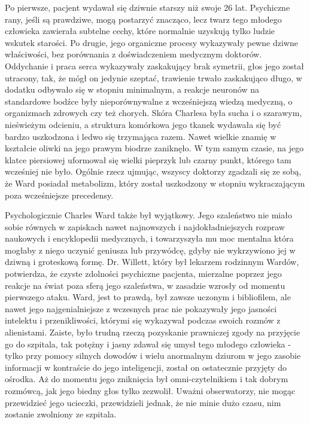 Po pierwsze, pacjent wydawał się dziwnie starszy niż swoje 26 lat. Psychiczne rany, jeśli są prawdziwe, mogą postarzyć znacząco, lecz twarz tego młodego człowieka zawierała subtelne cechy, które normalnie uzyskują tylko ludzie wskutek starości. Po drugie, jego organiczne procesy wykazywały pewne dziwne właściwości, bez porównania z doświadczeniem medycznym doktorów. Oddychanie i praca serca wykazywały zaskakujący brak symetrii, głos jego został utracony, tak, że mógł on jedynie szeptać, trawienie trwało zaskakująco długo, w dodatku odbywało się w stopniu minimalnym, a reakcje neuronów na standardowe bodźce były nieporównywalne z wcześniejszą wiedzą medyczną, o organizmach zdrowych czy też chorych. Skóra Charlesa była sucha i o szarawym, nieświeżym odcieniu, a struktura komórkowa jego tkanek wydawała się być bardzo uszkodzona i ledwo się trzymająca razem. Nawet wielkie znamię w kształcie oliwki na jego prawym biodrze zaniknęło. W tym samym czasie, na jego klatce piersiowej uformował się wielki pieprzyk lub czarny punkt, którego tam wcześniej nie było. Ogólnie rzecz ujmując, wszyscy doktorzy zgadzali się ze sobą, że Ward posiadał metabolizm, który został uszkodzony w stopniu wykraczającym poza wcześniejsze precedensy.

Psychologicznie Charles Ward także był wyjątkowy. Jego szaleństwo nie miało sobie równych w zapiskach nawet najnowszych i najdokładniejszych rozpraw naukowych i encyklopedii medycznych, i towarzyszyła mu moc mentalna która mogłaby z niego uczynić geniusza lub przywódcę, gdyby nie wykrzywiono jej w dziwną i groteskową formę. Dr. Willett, który był lekarzem rodzinnym Wardów, potwierdza, że czyste zdolności psychiczne pacjenta, mierzalne poprzez jego reakcje na świat poza sferą jego szaleństwa, w zasadzie wzrosły od momentu pierwszego ataku. Ward, jest to prawdą, był zawsze uczonym i bibliofilem, ale nawet jego najgenialniejsze z wczesnych prac nie pokazywały jego jasności intelektu i przenikliwości, którymi się wykazywał podczas swoich rozmów z alienistami. Zaiste, było trudną rzeczą pozyskanie prawniczej zgody na przyjęcie go do szpitala, tak potężny i jasny zdawał się umysł tego młodego człowieka - tylko przy pomocy silnych dowodów i wielu anormalnym dziurom w jego zasobie informacji w kontraście do jego inteligencji, został on ostatecznie przyjęty do ośrodka. Aż do momentu jego zniknięcia był omni-czytelnikiem i tak dobrym rozmówcą, jak jego biedny głos tylko zezwolił. Uważni obserwatorzy, nie mogąc przewidzieć jego ucieczki, przewidzieli jednak, że nie minie dużo czasu, nim zostanie zwolniony ze szpitala.

